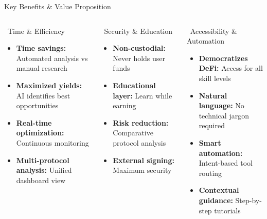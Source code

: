 \documentclass[aspectratio=169]{beamer}
\providecommand{\faShieldAlt}{\faLock}
\begin{document}
\begin{frame}{Key Benefits \& Value Proposition}
\begin{columns}
\begin{block}{\faClock\ Time \& Efficiency}
\begin{itemize}
\setlength\itemsep{-0.1em}
\item[\color{success}\faCheckCircle] \textbf{Time savings:} Automated analysis vs manual research
\item[\color{success}\faRocket] \textbf{Maximized yields:} AI identifies best opportunities
\item[\color{success}\faChartLine] \textbf{Real-time optimization:} Continuous monitoring
\item[\color{success}\faSync] \textbf{Multi-protocol analysis:} Unified dashboard view
\end{itemize}
\end{block}

\begin{block}{\faShieldAlt\ Security \& Education}
\begin{itemize}
\setlength\itemsep{-0.1em}
\item[\color{primary}\faLock] \textbf{Non-custodial:} Never holds user funds
\item[\color{primary}\faGraduationCap] \textbf{Educational layer:} Learn while earning
\item[\color{primary}\faExclamationTriangle] \textbf{Risk reduction:} Comparative protocol analysis
\item[\color{primary}\faUserShield] \textbf{External signing:} Maximum security
\end{itemize}
\end{block}

\begin{block}{\faUsers\ Accessibility \& Automation}
\begin{itemize}
\setlength\itemsep{-0.1em}
\item[\color{accent}\faHeart] \textbf{Democratizes DeFi:} Access for all skill levels
\item[\color{accent}\faComments] \textbf{Natural language:} No technical jargon required
\item[\color{accent}\faRobot] \textbf{Smart automation:} Intent-based tool routing
\item[\color{accent}\faChartPie] \textbf{Contextual guidance:} Step-by-step tutorials
\end{itemize}
\end{block}


\end{columns}
\end{frame}
\end{document}

